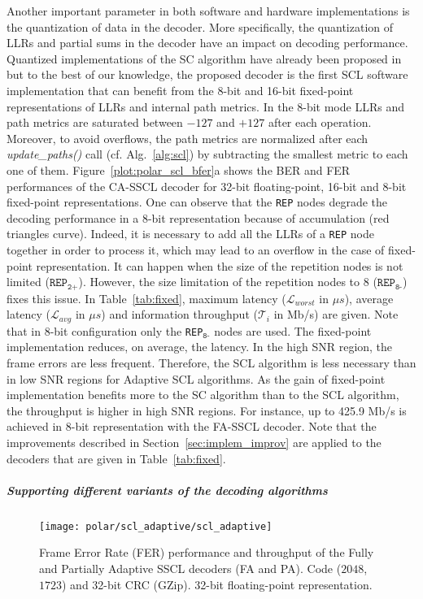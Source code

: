 Another important parameter in both software and hardware implementations is the
quantization of data in the decoder. More specifically, the quantization of LLRs
and partial sums in the decoder have an impact on decoding performance.
Quantized implementations of the SC algorithm have already been proposed
in~\cite{Giard2016} but to the best of our knowledge, the proposed decoder is
the first SCL software implementation that can benefit from the 8-bit and 16-bit
fixed-point representations of LLRs and internal path metrics. In the 8-bit mode
LLRs and path metrics are saturated between $-127$ and $+127$ after each
operation. Moreover, to avoid overflows, the path metrics are normalized after
each \textit{update\_paths()} call (cf. Alg.~\ref{alg:scl}) by subtracting the
smallest metric to each one of them. Figure~\ref{plot:polar_scl_bfer}a shows the
BER and FER performances of the CA-SSCL decoder for 32-bit floating-point,
16-bit and 8-bit fixed-point representations. One can observe that the
\texttt{REP} nodes degrade the decoding performance in a 8-bit representation
because of accumulation (red triangles curve). Indeed, it is necessary to add
all the LLRs of a \texttt{REP} node together in order to process it, which may
lead to an overflow in the case of fixed-point representation. It can happen
when the size of the repetition nodes is not limited
($\texttt{REP}_\texttt{2+}$). However, the size limitation of the repetition
nodes to 8 ($\texttt{REP}_\texttt{8-}$) fixes this issue. In
Table~\ref{tab:fixed}, maximum latency ($\mathcal{L}_{worst}$ in $\mu s$),
average latency ($\mathcal{L}_{avg}$ in $\mu s$) and information throughput
($\mathcal{T}_i$ in Mb/s) are given. Note that in 8-bit configuration only the
\texttt{REP}$_{\texttt{8-}}$ nodes are used. The fixed-point implementation
reduces, on average, the latency. In the high SNR region, the frame errors are
less frequent. Therefore, the SCL algorithm is less necessary than in low SNR
regions for Adaptive SCL algorithms. As the gain of fixed-point implementation
benefits more to the SC algorithm than to the SCL algorithm, the throughput is
higher in high SNR regions. For instance, up to 425.9 Mb/s is achieved in 8-bit
representation with the FA-SSCL decoder. Note that the improvements described in
Section~\ref{sec:implem_improv} are applied to the decoders that are given in
Table~\ref{tab:fixed}.

\subparagraph{Supporting different variants of the decoding algorithms}

\begin{figure}[t]
  \centering
  \texttt{[image: polar/scl\_adaptive/scl\_adaptive]}
  \caption{Frame Error Rate (FER) performance and throughput of the Fully and
    Partially Adaptive SSCL decoders (FA and PA). Code ($2048$,$1723$) and
    32-bit CRC (GZip). 32-bit floating-point representation.}
  \label{plot:polar_scl_adaptive}
\end{figure}

